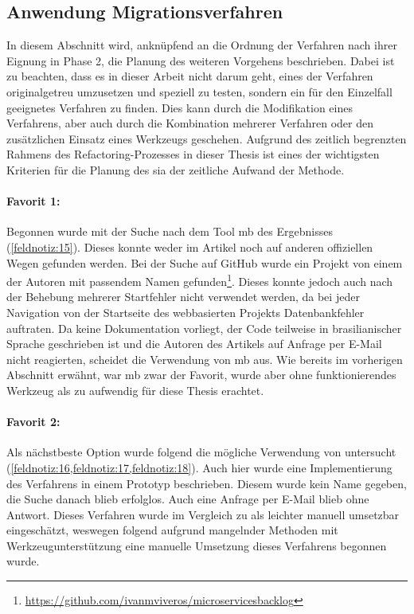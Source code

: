 \subsection{Anwendung Migrationsverfahren}
\label{sec:anwendung-verfahren}
In diesem Abschnitt wird, anknüpfend an die Ordnung der Verfahren nach ihrer Eignung in Phase 2, die Planung des weiteren Vorgehens beschrieben.
Dabei ist zu beachten, dass es in dieser Arbeit nicht darum geht, eines der Verfahren originalgetreu umzusetzen und speziell zu testen, sondern ein für den Einzelfall geeignetes Verfahren zu finden.
Dies kann durch die Modifikation eines Verfahrens, aber auch durch die Kombination mehrerer Verfahren oder den zusätzlichen Einsatz eines Werkzeugs geschehen.
Aufgrund des zeitlich begrenzten Rahmens des Refactoring-Prozesses in dieser Thesis ist eines der wichtigsten Kriterien für die Planung des \gls{sia} der zeitliche Aufwand der Methode.

\paragraph{Favorit 1:} Begonnen wurde mit der Suche nach dem Tool \gls{mb} des Ergebnisses  (\cref{feldnotiz:15}).
Dieses konnte weder im Artikel noch auf anderen offiziellen Wegen gefunden werden.
Bei der Suche auf GitHub wurde ein Projekt von einem der Autoren mit passendem Namen gefunden\footnote{\url{https://github.com/ivanmviveros/microservicesbacklog}}.
Dieses konnte jedoch auch nach der Behebung mehrerer Startfehler nicht verwendet werden, da bei jeder Navigation von der Startseite des webbasierten Projekts Datenbankfehler auftraten.
Da keine Dokumentation vorliegt, der Code teilweise in brasilianischer Sprache geschrieben ist und die Autoren des Artikels auf Anfrage per E-Mail nicht reagierten, scheidet die Verwendung von \gls{mb} aus.
Wie bereits im vorherigen Abschnitt erwähnt, war \gls{mb} zwar der Favorit, wurde aber ohne funktionierendes Werkzeug als zu aufwendig für diese Thesis erachtet.

\paragraph{Favorit 2:} Als nächstbeste Option wurde folgend die mögliche Verwendung von  untersucht (\cref{feldnotiz:16,feldnotiz:17,feldnotiz:18}).
Auch hier wurde eine Implementierung des Verfahrens in einem Prototyp beschrieben.
Diesem wurde kein Name gegeben, die Suche danach blieb erfolglos.
Auch eine Anfrage per E-Mail blieb ohne Antwort.
Dieses Verfahren wurde im Vergleich zu   als leichter manuell umsetzbar eingeschätzt, weswegen folgend aufgrund mangelnder Methoden mit Werkzeugunterstützung eine manuelle Umsetzung dieses Verfahrens begonnen wurde.


